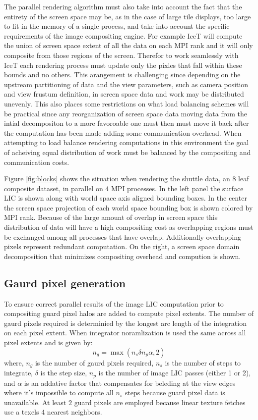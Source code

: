 \documentclass[a4paper,10pt]{article}
\begin{document}
The parallel rendering algorithm must also take into account the fact that the entirety of the screen space may be, as in the case of large tile displays, too large to fit in the memory of a single process, and take into account the specific requirements of the image compositing engine. For example IceT will compute the union of screen space extent of all the data on each MPI rank and it will only composite from those regions of the screen. Therefor to work seamlessly with IceT each rendering process must update only the pixles that fall within these bounds and no others. This arangement is challenging since depending on the upstream partitioning of data and the view parameters, such as camera position and view frustum definition, in screen space data and work may be distributed unevenly. This also places some restrictions on what load balancing schemes will be practical since any reorganization of screen space data moving data from the intial decompositon to a more favoroable one must then must move it back after the computation has been made adding some communication overhead. When attempting to load balance rendering computations in this environment the goal of acheiving equal distribution of work must be balanced by the compositing and communication costs.

Figure \ref{fig:blocks} shows the situation when rendering the shuttle data, an 8 leaf composite dataset, in parallel on 4 MPI processes. In the left panel the surface LIC is shown along with world space axis aligned bounding boxes. In the center the screen space projection of each world space bounding box is shown colored by MPI rank. Because of the large amount of overlap in screen space this distribution of data will have a high compositing cost as overlapping regions must be exchanged among all processes that have overlap. Additionally overlapping pixels represent redundant computation. On the right, a screen space domain decomposition that minimizes compositing overhead and compution is shown.

\subsection{Gaurd pixel generation}
To ensure correct parallel results of the image LIC computation prior to compositing guard pixel halos are added to compute pixel extents. The number of gaurd pixels required is determinied by the longest arc length of the integration on each pixel extent. When integrator noramlization is used the same across all pixel extents and is given by:
\begin{equation}
n_g = \max( n_s \delta n_p \alpha,  2)
\label{eqn:gaurd-norm}
\end{equation}
where, $n_g$ is the number of gaurd pixels required, $n_s$ is the number of steps to integrate, $\delta$ is the step size, $n_p$ is the number of image LIC passes (either 1 or 2), and $\alpha$ is an addative factor that compensates for beleding at the view edges where it's impossible to compute all $n_s$ steps because guard pixel data is unavailable. At least $2$ guard pixels are employed because linear texture fetches use a texels 4 nearest neighbors.
\end{document}
